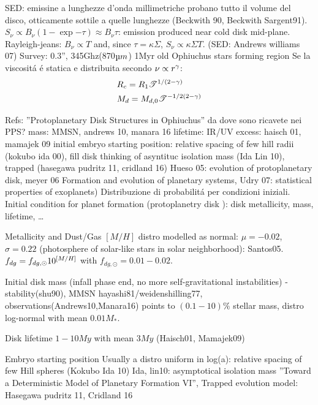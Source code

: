 \begin{workout}
SED: emissine a lunghezze d'onda millimetriche probano tutto il volume del disco, otticamente sottile a quelle lunghezze (Beckwith 90, Beckwith Sargent91).
$S_{\nu}\propto B_{\nu}(1-\exp{-\tau})\approx B_{\nu}\tau$: emission produced near cold disk mid-plane.
Rayleigh-jeans: $B_{\nu}\propto T$ and, since $\tau=\kappa\Sigma$, $S_{\nu}\propto \kappa\Sigma T$.
(SED: Andrews williams 07)
Survey: 0.3'', 345Ghz(870$\micro m$) 1Myr old Ophiuchus stars forming region
Se la viscosit\'a \'e statica e distribuita secondo $\nu\propto r^{\gamma}$:
\begin{align}
&R_c=R_1\mathcal{T}^{1/(2-\gamma)}\\
&M_d=M_{d,0}\mathcal{T}^{-1/2(2-\gamma)}\\
\end{align}
\end{workout}

\begin{workout}
Refs: ''Protoplanetary Disk Structures in Ophiuchus''
da dove sono ricavete nei PPS?
mass: MMSN, andrews 10, manara 16
lifetime: IR/UV excess: haisch 01, mamajek 09
initial embryo starting position: relative spacing of few hill radii (kokubo ida 00), fill disk thinking of asyntituc isolation mass (Ida Lin 10), trapped (hasegawa pudritz 11, cridland 16)
Hueso 05: evolution of protoplanetary disk, meyer 06 Formation and evolution of planetary systems, Udry 07: statistical properties of exoplanets)
Distribuzione di probabilit\'a per condizioni iniziali.
Initial condition for planet formation (protoplanetry disk \cite{meyer2006formation}): disk metallicity, mass, lifetime, \ldots

{Metallicity and Dust/Gas}
$[M/H]$ distro modelled as normal: $\mu=-0.02$, $\sigma=0.22$ (photosphere of solar-like stars in solar neighborhood): Santos05.
$f_{dg}=f_{dg,\odot}10^{[M/H]}$ with $f_{dg,\odot}=0.01-0.02$.

Initial disk mass
(infall phase end, no more self-gravitational instabilities) - stability(shu90), MMSN hayashi81/weidenshilling77, observations(Andrews10,Manara16) points to $(0.1-10)\%$ stellar mass, distro log-normal with mean $0.01M_*$.

{Disk lifetime}
$1-10My$ with mean $3My$ (Haisch01, Mamajek09)

{Embryo starting position}
Usually a distro uniform in log(a): relative spacing of few Hill spheres (Kokubo Ida 10)
Ida, lin10: asymptotical isolation mass ''Toward a Deterministic Model of Planetary Formation VI'',
Trapped evolution model: Hasegawa pudritz 11, Cridland 16

\end{workout}

